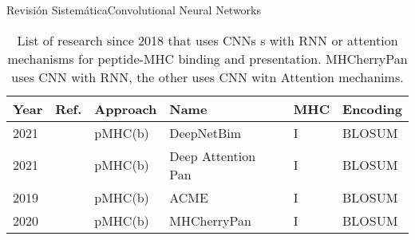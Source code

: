 \documentclass[10pt]{beamer}
\newcommand{\1}{
	\setbeamertemplate{background}{
		\texttt{[image: img/1]}
		\tikz[overlay] \fill[fill opacity=0.75,fill=white] (0,0) rectangle (-\paperwidth,\paperheight);
	}
}
\begin{document}
\begin{frame}{Revisión Sistemática}{Convolutional Neural Networks}
	
	\fontsize{8pt}{5pt}\selectfont
	
	\begin{table}[]
		\centering
		\caption{List of research since 2018 that uses CNNs s with RNN or attention mechanisms for peptide-MHC binding and presentation. MHCherryPan uses CNN with RNN, the other uses CNN witn Attention mechanims.}		
		\setlength{\tabcolsep}{0.5em} %
		{\renewcommand{\arraystretch}{2}%
			\begin{tabular}{p{0.6cm}p{0.6cm}p{1.5cm}p{2cm}p{0.6cm}p{2.7cm}}
				\textbf{Year} & \textbf{Ref.}                              & \textbf{Approach}   & \textbf{Name}    & \textbf{MHC} & \textbf{Encoding}                                           \\ \hline
				2021          & \cite{yang2021deepnetbim} & pMHC(b) & DeepNetBim       & I        & BLOSUM              \\
				
				2021          & \cite{jin2021deep}        & pMHC(b) & Deep Attention Pan & I        & BLOSUM                    \\
				
				2019          & \cite{hu2019acme}         & pMHC(b) & ACME             & I        & BLOSUM      \\
				
				2020          & \cite{xie2020mhcherrypan} & pMHC(b) & MHCherryPan      & I        & BLOSUM          
			\end{tabular}
		}
	\end{table}	
\end{frame}
\end{document}
